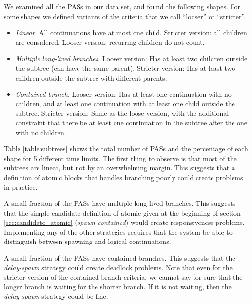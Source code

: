 \documentclass[acmsmall,anonymous,review]{acmart}\settopmatter{printfolios=true,printccs=false,printacmref=false}
\begin{document}
We examined all the PASs in our data set, and found the following shapes.
For some shapes we defined variants of the criteria that we call ``looser'' or ``stricter''.

\begin{itemize}
\item \emph{Linear}. All continuations have at most one child.
  Stricter version: all children are considered.
  Looser version: recurring children do not count.
\item \emph{Multiple long-lived branches}. Looser version: Has at least two children outside the subtree (can have the same parent).
Stricter version: Has at least two children outside the subtree with different parents.
\item \emph{Contained branch}. Looser version: Has at least one continuation with no children, and at least one continuation with at least one child outside the subtree.
  Stricter version: Same as the loose version, with the additional constraint that there be at least one continuation in the subtree after the one with no children.
\end{itemize}

Table \ref{table:subtrees} shows the total number of PASs and the percentage of each shape for 5 different time limits.
The first thing to observe is that most of the subtrees are linear, but not by an overwhelming margin.
This suggests that a definition of atomic blocks that handles branching poorly could create problems in practice.

A small fraction of the PASs have multiple long-lived branches.
This suggests that the simple candidate definition of atomic given at the beginning of section \ref{sec:candidate_atomic} (\emph{spawn-contained}) would create responsiveness problems.
Implementing any of the other strategies requires that the system be able to distinguish between spawning and logical continuations.

A small fraction of the PASs have contained branches.
This suggests that the \emph{delay-spawn} strategy could create deadlock problems.
Note that even for the stricter version of the contained branch criteria, we cannot say for sure that the longer branch is waiting for the shorter branch.
If it is not waiting, then the \emph{delay-spawn} strategy could be fine.

\end{document}
